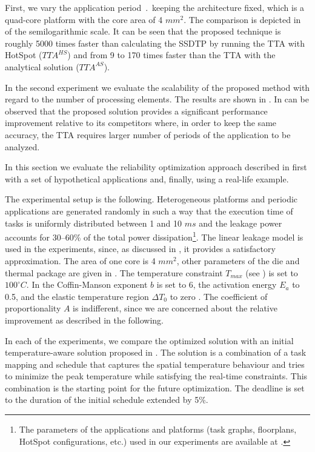 First, we vary the application period $\period$ keeping the architecture fixed, which is a quad-core platform with the core area of 4 $mm^2$. The comparison is depicted in  of the semilogarithmic scale. It can be seen that the proposed technique is roughly 5000 times faster than calculating the SSDTP by running the TTA with HotSpot ($TTA^{HS}$) and from 9 to 170 times faster than the TTA with the analytical solution ($TTA^{AS}$).

In the second experiment we evaluate the scalability of the proposed method with regard to the number of processing elements. The results are shown in . In can be observed that the proposed solution provides a significant performance improvement relative to its competitors where, in order to keep the same accuracy, the TTA requires larger number of periods of the application to be analyzed.

 \label{sec:reliability-results}
In this section we evaluate the reliability optimization approach described in  first with a set of hypothetical applications and, finally, using a real-life example.

The experimental setup is the following. Heterogeneous platforms and periodic applications are generated randomly \cite{dick1998} in such a way that the execution time of tasks is uniformly distributed between 1 and 10 $ms$ and the leakage power accounts for 30--60\% of the total power dissipation\footnote{The parameters of the applications and platforms (task graphs, floorplans, HotSpot configurations, etc.) used in our experiments are available at \cite{liu2011}.}. The linear leakage model is used in the experiments, since, as discussed in , it provides a satisfactory approximation. The area of one core is 4 $mm^2$, other parameters of the die and thermal package are given in . The temperature constraint $T_{max}$ (see ) is set to $100^\circ C$. In  the Coffin-Manson exponent $b$ is set to 6, the activation energy $E_a$ to 0.5, and the elastic temperature region $\Delta T_0$ to zero \cite{jedec2010}. The coefficient of proportionality $A$ is indifferent, since we are concerned about the relative improvement as described in the following.

In each of the experiments, we compare the optimized solution with an initial temperature-aware solution proposed in \cite{xie2006}. The solution is a combination of a task mapping and schedule that captures the spatial temperature behaviour and tries to minimize the peak temperature while satisfying the real-time constraints. This combination is the starting point for the future optimization. The deadline is set to the duration of the initial schedule extended by 5\%.

